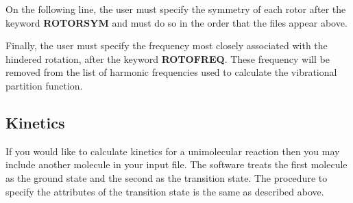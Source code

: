\documentclass[a4paper,12pt]{article}
\begin{document}
On the following line, the user must specify the symmetry of each rotor after the keyword \textbf{ROTORSYM} and must do so in the order that the files appear above.

Finally, the user must specify the frequency most closely associated with the hindered rotation, after the keyword \textbf{ROTOFREQ}. These frequency will be removed from the list of harmonic frequencies used to calculate the vibrational partition function.

\subsection{Kinetics}
If you would like to calculate kinetics for a unimolecular reaction then you may include another molecule in your input file. The software treats the first molecule as the ground state and the second as the transition state. The procedure to specify the attributes of the transition state is the same as described above.
\end{document}
